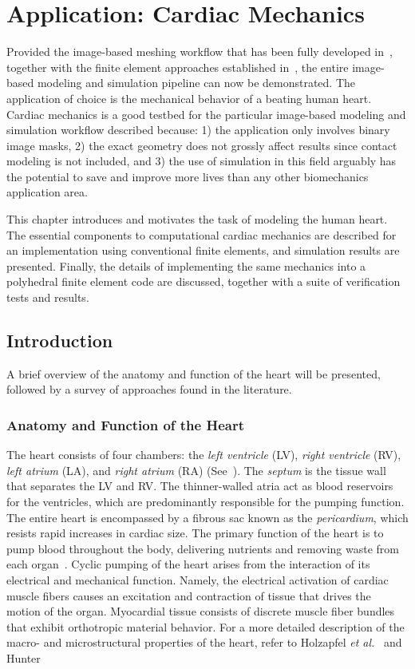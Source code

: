 \chapter{Application: Cardiac Mechanics}
\label{chap:5}
%
Provided the image-based meshing workflow that has been fully developed in~, together with the finite element approaches established in~, the entire image-based modeling and simulation pipeline can now be demonstrated. The application of choice is the mechanical behavior of a beating human heart. Cardiac mechanics is a good testbed for the particular image-based modeling and simulation workflow described because: 1) the application only involves binary image masks, 2) the exact geometry does not grossly affect results since contact modeling is not included, and 3) the use of simulation in this field arguably has the potential to save and improve more lives than any other biomechanics application area.

This chapter introduces and motivates the task of modeling the human heart. The essential components to computational cardiac mechanics are described for an implementation using conventional finite elements, and simulation results are presented. Finally, the details of implementing the same mechanics into a polyhedral finite element code are discussed, together with a suite of verification tests and results.

\section{Introduction}

A brief overview of the anatomy and function of the heart will be presented, followed by a survey of approaches found in the literature.

\subsection{Anatomy and Function of the Heart}
The heart consists of four chambers: the \textit{left ventricle} (LV), \textit{right ventricle} (RV), \textit{left atrium} (LA), and \textit{right atrium} (RA) (See~). The \textit{septum} is the tissue wall that separates the LV and RV. The thinner-walled atria act as blood reservoirs for the ventricles, which are predominantly responsible for the pumping function. The entire heart is encompassed by a fibrous sac known as the \textit{pericardium}, which resists rapid increases in cardiac size. The primary function of the heart is to pump blood throughout the body, delivering nutrients and removing waste from each organ~\cite{holzapfel_2009}. Cyclic pumping of the heart arises from the interaction of its electrical and mechanical function. Namely, the electrical activation of cardiac muscle fibers causes an excitation and contraction of tissue that drives the motion of the organ. Myocardial tissue consists of discrete muscle fiber bundles that exhibit orthotropic material behavior. For a more detailed description of the macro- and microstructural properties of the heart, refer to Holzapfel \textit{et al.}~\cite{holzapfel_2009} and Hunter~\cite{holzapfel_2009} 

